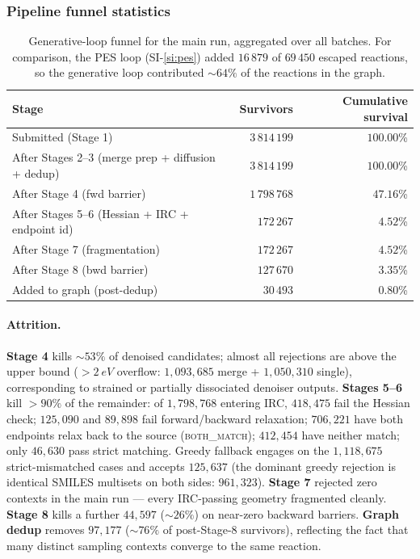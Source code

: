 \subsubsection{Pipeline funnel statistics}
\label{sec:funnel}

\begin{table}
\centering
\begin{tabular}{lrr}
\toprule
Stage & Survivors & Cumulative survival \\
\midrule
Submitted (Stage 1)                                  & $3\,814\,199$         & $100.00$\% \\
After Stages 2--3 (merge prep + diffusion + dedup)   & $3\,814\,199$         & $100.00$\% \\
After Stage 4 (fwd barrier)                          & $1\,798\,768$         & $47.16$\%  \\
After Stages 5--6 (Hessian + IRC + endpoint id)      & $172\,267$            & $4.52$\%   \\
After Stage 7 (fragmentation)                        & $172\,267$            & $4.52$\%   \\
After Stage 8 (bwd barrier)                          & $127\,670$            & $3.35$\%   \\
\midrule
Added to graph (post-dedup)                          & $30\,493$             & $0.80$\%   \\
\bottomrule
\end{tabular}
\caption{Generative-loop funnel for the main run, aggregated over all batches. For comparison, the PES loop (SI-\ref{si:pes}) added $16\,879$ of $69\,450$ escaped reactions, so the generative loop contributed $\sim 64\%$ of the reactions in the graph.}
\label{tab:funnel}
\end{table}

\paragraph{Attrition.}
\textbf{Stage 4} kills $\sim 53\%$ of denoised candidates; almost all rejections are above the upper bound ($> \SI{2}{eV}$ overflow: $1{,}093{,}685$ merge + $1{,}050{,}310$ single), corresponding to strained or partially dissociated denoiser outputs. \textbf{Stages 5--6} kill $> 90\%$ of the remainder: of $1{,}798{,}768$ entering IRC, $418{,}475$ fail the Hessian check; $125{,}090$ and $89{,}898$ fail forward/backward relaxation; $706{,}221$ have both endpoints relax back to the source (\textsc{both\_match}); $412{,}454$ have neither match; only $46{,}630$ pass strict matching. Greedy fallback engages on the $1{,}118{,}675$ strict-mismatched cases and accepts $125{,}637$ (the dominant greedy rejection is identical SMILES multisets on both sides: $961{,}323$). \textbf{Stage 7} rejected zero contexts in the main run --- every IRC-passing geometry fragmented cleanly. \textbf{Stage 8} kills a further $44{,}597$ ($\sim 26\%$) on near-zero backward barriers. \textbf{Graph dedup} removes $97{,}177$ ($\sim 76\%$ of post-Stage-8 survivors), reflecting the fact that many distinct sampling contexts converge to the same reaction.

